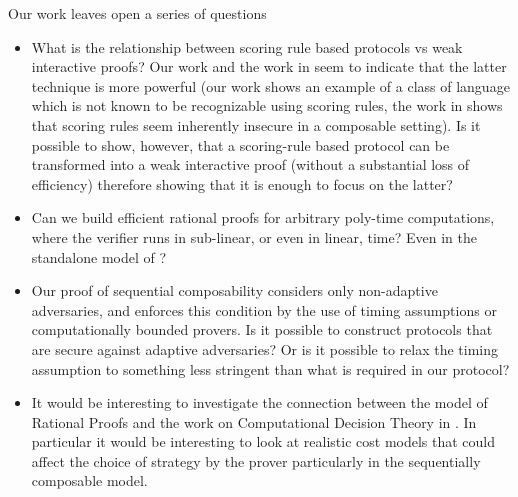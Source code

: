 	Our work leaves open a series of questions
	\begin{itemize}
		\item What is the relationship between scoring rule based protocols vs weak interactive proofs? Our work and the work in \cite{cg15} seem to indicate that the latter technique is more powerful (our work shows an example of a class of language which is not known to be recognizable using scoring rules, the work in \cite{cg15} shows that scoring rules seem inherently insecure in a composable setting). Is it possible to show, however, that a scoring-rule based protocol can be transformed into a weak interactive proof (without a substantial loss of efficiency) therefore showing that it is enough to focus on the latter?
		
		\item Can we build efficient rational proofs for arbitrary poly-time computations, where the verifier runs in sub-linear, or even in linear, time? Even in the standalone model of \cite{am}?
		
		\item Our proof of sequential composability considers only non-adaptive adversaries, and enforces this condition by the use of timing assumptions or computationally bounded provers. Is it possible to construct protocols that are secure against adaptive adversaries? Or is it possible to relax the timing assumption to something less stringent than what is required in our protocol?
		
		\item It would be interesting to investigate the connection between the model of Rational Proofs and the work on Computational Decision Theory in  \cite{halpern2011don}. In particular it would be interesting to look at realistic cost models that could affect the choice of strategy by the prover particularly in the sequentially composable model. 
	\end{itemize}
	
	
%
%

%
%
%
%
